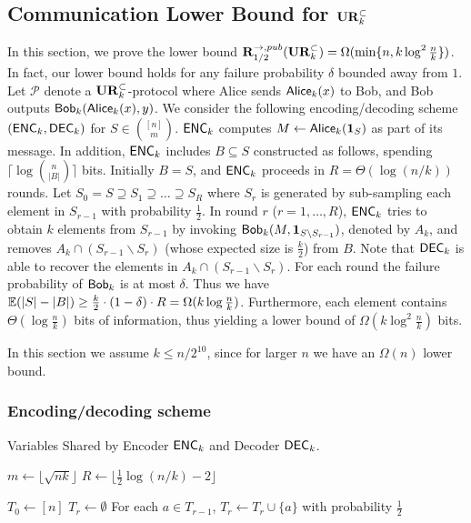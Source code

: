 \subsection{Communication Lower Bound for $\mathbf{UR}_k^\subset$}\label{sec:k-samples-lb}

In this section, we prove the lower bound $\mathbf{R}^{\rightarrow,pub}_{1/2}(\mathbf{UR}^\subset_k) = \Omega(\min\{n, k\log^2 \frac{n}{k}\})$. In fact, our lower bound holds for any failure probability $\delta$ bounded away from $1$. Let $\mathcal{P}$ denote a $\mathbf{UR}_k^\subset$-protocol where Alice sends $\mathsf{Alice}_k(x)$ to Bob, and Bob outputs $\mathsf{Bob}_k(\mathsf{Alice}_k(x), y)$.  We consider the following encoding/decoding scheme $(\textsf{ENC}_k, \textsf{DEC}_k)$ for $S\in {[n] \choose m}$.  $\textsf{ENC}_k$ computes $M\leftarrow \mathsf{Alice}_k(\mathbf{1}_S)$ as part of its message. In addition, $\textsf{ENC}_k$ includes $B\subseteq S$ constructed as follows, spending $\lceil\log{n\choose |B|}\rceil$ bits.  Initially $B= S$, and $\textsf{ENC}_k$ proceeds in $R=\Theta(\log (n/k))$ rounds.  Let $S_0=S\supseteq S_1\supseteq \ldots \supseteq S_R$ where $S_r$ is generated by sub-sampling each element in $S_{r-1}$ with probability $\frac{1}{2}$.  In round $r$ ($r=1,\ldots, R$), $\textsf{ENC}_k$ tries to obtain $k$ elements from $S_{r-1}$ by invoking $\mathsf{Bob}_k(M, \mathbf{1}_{S\backslash S_{r-1}})$, denoted by $A_k$, and removes $A_k\cap (S_{r-1}\backslash S_{r})$ (whose expected size is $\frac{k}{2}$) from $B$.  Note that $\textsf{DEC}_k$ is able to recover the elements in $A_k\cap (S_{r-1}\backslash S_{r})$.  For each round the failure probability of $\mathsf{Bob}_k$ is at most $\delta$.  Thus we have $\operatorname*{\mathbb{E}}(|S|-|B|)\ge \frac{k}{2}\cdot (1-\delta) \cdot R=\Omega(k\log\frac{n}{k})$.  Furthermore, each element contains $\Theta(\log \frac{n}{k})$ bits of information, thus yielding a lower bound of $\Omega(k\log^2\frac{n}{k})$ bits.

In this section we assume $k \le n/2^{10}$, since for larger $n$ we have an $\Omega(n)$ lower bound.

\subsubsection{Encoding/decoding scheme}
\begin{algorithm}[H] 
  \caption{Variables Shared by Encoder $\textsf{ENC}_k$ and Decoder $\textsf{DEC}_k$.} \label{algo:para4}
  \begin{algorithmic}[1] 
    \State $m\leftarrow \lfloor \sqrt{nk} \rfloor$
    \State $R\leftarrow \lfloor \frac{1}{2}\log (n/k) - 2 \rfloor$ \begin{flushright} \end{flushright}
    \State $T_0\leftarrow [n]$
      \State $T_r\leftarrow \emptyset$
      \State For each $a\in T_{r-1}$, $T_r\leftarrow T_r\cup \{a\}$ with probability $\frac{1}{2}$ 
    \EndFor
  \end{algorithmic}
\end{algorithm}

